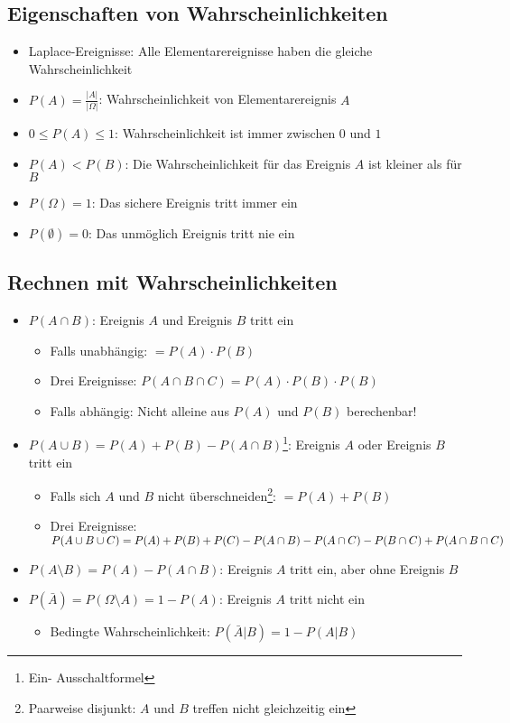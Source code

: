 \subsection{Eigenschaften von Wahrscheinlichkeiten}
\begin{itemize}
  \item Laplace-Ereignisse: Alle Elementarereignisse haben die gleiche
    Wahrscheinlichkeit
  \item $P(A) = \frac{|A|}{|\Omega|}$: Wahrscheinlichkeit von
    Elementarereignis $A$
  \item $0 \le P(A) \le 1$: Wahrscheinlichkeit ist immer zwischen $0$
    und $1$
  \item $P(A) < P(B)$: Die Wahrscheinlichkeit für das Ereignis $A$ ist
    kleiner als für $B$
  \item $P(\Omega) = 1$: Das sichere Ereignis tritt immer ein
  \item $P(\emptyset) = 0$: Das unmöglich Ereignis tritt nie ein
\end{itemize}

\subsection{Rechnen mit Wahrscheinlichkeiten}
\begin{itemize}
  \item $P(A \cap B)$: Ereignis $A$ und Ereignis $B$ tritt ein
    \begin{itemize}
      \item Falls unabhängig: $= P(A) \cdot P(B)$
      \item Drei Ereignisse:
        $P(A \cap B \cap C) = P(A) \cdot P(B) \cdot P(B)$
      \item Falls abhängig: Nicht alleine aus $P(A)$ und $P(B)$
        berechenbar!
    \end{itemize}
  \item $P(A \cup B) = P(A) + P(B) - P(A \cap B)$\footnote{Ein-
    Ausschaltformel}: Ereignis $A$ oder Ereignis $B$ tritt ein
    \begin{itemize}
      \item Falls sich $A$ und $B$ nicht überschneiden\footnote{
        Paarweise disjunkt: $A$ und $B$ treffen nicht gleichzeitig ein}:
        $= P(A) + P(B)$
      \item Drei Ereignisse: $P(A \cup B \cup C) \\ = P(A) + P(B) + P(C)
        - P(A \cap B) - P(A \cap C) - P(B \cap C) + P(A \cap B \cap C)$
    \end{itemize}
  \item $P(A \setminus B) = P(A) - P(A \cap B)$: Ereignis $A$ tritt ein, aber ohne
    Ereignis $B$
  \item $P(\bar{A}) = P(\Omega \setminus A) = 1 - P(A)$: Ereignis $A$
    tritt nicht ein
  \begin{itemize}
    \item Bedingte Wahrscheinlichkeit: $P(\bar{A}|B) = 1 - P(A|B)$
  \end{itemize}
\end{itemize}

